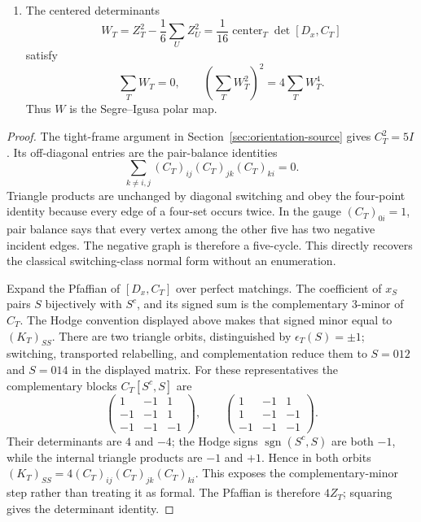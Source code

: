 \begin{theorem}
\begin{enumerate}
\[\]
They are the signed Joubert coordinates and hence define the classical map
from six labelled points to the Segre cubic
\[
 \left\{[z]\in\mathbf P^5:\sum_Tz_T=\sum_Tz_T^3=0\right\}.
\]
Inside its hyperplane \(z_T=0\), the remaining linear relation cuts the
ambient space to \(\mathbf P^3\), and the remaining cubic equation is the
diagonal Clebsch cubic surface.
\item The centered determinants
\[
 W_T=Z_T^2-\frac16\sum_UZ_U^2
     =\frac1{16}\operatorname{center}_T\det[D_x,C_T]
\]
satisfy
\[
 \sum_TW_T=0,
 \qquad
 \left(\sum_TW_T^2\right)^2=4\sum_TW_T^4.
\]
Thus \(W\) is the Segre--Igusa polar map.
\end{enumerate}
\end{theorem}

\begin{proof}
The tight-frame argument in Section~\ref{sec:orientation-source} gives
\(C_T^2=5I\).  Its off-diagonal entries are the pair-balance identities
\[
 \sum_{k\ne i,j}(C_T)_{ij}(C_T)_{jk}(C_T)_{ki}=0.
\]
Triangle products are unchanged by diagonal switching and obey the
four-point identity because every edge of a four-set occurs twice.  In the
gauge \((C_T)_{0i}=1\), pair balance says that every vertex among the other
five has two negative incident edges.  The negative graph is therefore a
five-cycle.  This directly recovers the classical switching-class normal
form without an enumeration.

Expand the Pfaffian of \([D_x,C_T]\) over perfect matchings.  The coefficient
of \(x_S\) pairs \(S\) bijectively with \(S^c\), and its signed sum is the
complementary \(3\)-minor of \(C_T\).  The Hodge convention displayed above
makes that signed minor equal to \((K_T)_{SS}\).  There are two triangle
orbits, distinguished by \(\epsilon_T(S)=\pm1\); switching, transported
relabelling, and complementation reduce them to \(S=012\) and \(S=014\) in
the displayed matrix.  For these representatives the complementary blocks
\(C_T[S^c,S]\) are
\[
 \begin{pmatrix}1&-1&1\\-1&-1&1\\-1&-1&-1\end{pmatrix},
 \qquad
 \begin{pmatrix}1&-1&1\\1&-1&-1\\-1&-1&-1\end{pmatrix}.
\]
Their determinants are \(4\) and \(-4\); the Hodge signs
\(\operatorname{sgn}(S^c,S)\) are both \(-1\), while the internal triangle
products are \(-1\) and \(+1\).  Hence in both orbits
\((K_T)_{SS}=4(C_T)_{ij}(C_T)_{jk}(C_T)_{ki}\).  This exposes the
complementary-minor step rather than treating it as formal.  The Pfaffian is
therefore \(4Z_T\); squaring gives the determinant identity.


\end{proof}
